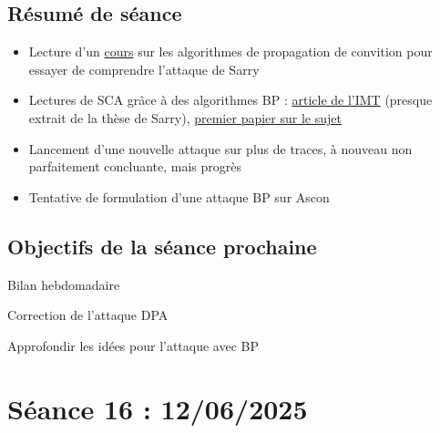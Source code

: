 \documentclass[12pt]{article}
\newcommand{\cmark}{\ding{51}}%
\newcommand{\xmark}{\ding{55}}%
\newcommand{\done}{\rlap{$\square$}{\raisebox{2pt}{\large\hspace{1pt}\cmark}}%
	\hspace{-2.5pt}}
\newcommand{\wontfix}{\rlap{$\square$}{\large\hspace{1pt}\xmark}}
\begin{document}
	\subsection{Résumé de séance}
	\begin{itemize}
		\item Lecture d'un \href{http://helper.ipam.ucla.edu/publications/gss2013/gss2013_11344.pdf}{cours} sur les algorithmes de propagation de convition pour essayer de comprendre l'attaque de Sarry
		\item Lectures de SCA grâce à des algorithmes BP : \href{https://link.springer.com/chapter/10.1007/978-3-031-54409-5_7}{article de l'IMT} (presque extrait de la thèse de Sarry), \href{https://link.springer.com/chapter/10.1007/978-3-662-45611-8_15}{premier papier sur le sujet}
		\item Lancement d'une nouvelle attaque sur plus de traces, à nouveau non parfaitement concluante, mais progrès
		\item Tentative de formulation d'une attaque BP sur Ascon
	\end{itemize}
	
	\subsection{Objectifs de la séance prochaine}
	\begin{todolist}
		\item[\done] Bilan hebdomadaire
		\item Correction de l'attaque DPA
		\item[\wontfix] Approfondir les idées pour l'attaque avec BP
	\end{todolist}
	
	
	\section{Séance 16 : 12/06/2025}
\end{document}
